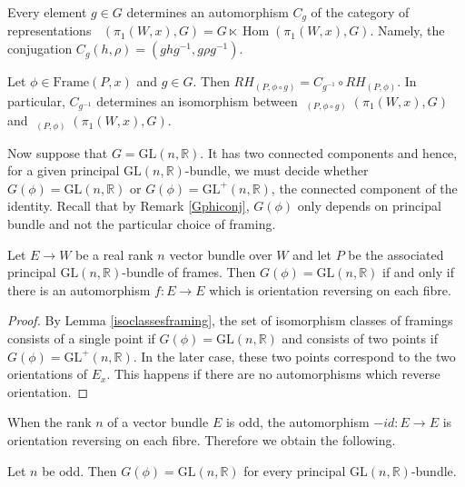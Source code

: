 \documentclass[10pt]{amsart}
\newcommand{\Hom}{\operatorname{Hom}}
\DeclareMathOperator{\Rep}{\underline{\operatorname{Rep}}}
\numberwithin{theoremalpha}{section}
\numberwithin{equation}{section}
\numberwithin{definition}{section}
\numberwithin{theorem}{section}
\numberwithin{proposition}{section}
\numberwithin{lemma}{section}
\numberwithin{example}{section}
\numberwithin{remark}{section}
\numberwithin{corollary}{section}
\numberwithin{question}{section}
\numberwithin{problem}{section}
\numberwithin{assumption}{section}
\theoremstyle{named}
\numberwithin{equation}{section}
\begin{document}
Every element $g \in G$ determines an automorphism $C_{g}$ of the category of representations $\Rep(\pi_{1}(W, x), G) = G \ltimes \Hom(\pi_{1}(W,x), G)$. Namely, the conjugation $C_{g}(h, \rho) = (ghg^{-1}, g \rho g^{-1})$. 

\begin{lemma}\label{lem:dependenceframing}
Let $\phi \in \mathrm{Frame}(P,x)$ and $g \in G$. Then $RH_{(P, \phi \circ g)} = C_{g^{-1}} \circ RH_{(P, \phi)}$. In particular, $C_{g^{-1}}$ determines an isomorphism between $\Rep_{(P,\phi \circ g)}(\pi_{1}(W, x), G)$ and $\Rep_{(P,\phi)}(\pi_{1}(W, x), G)$. 
\end{lemma}

Now suppose that $G = \mathrm{GL}(n, \mathbb{R})$. It has two connected components and hence, for a given principal $\mathrm{GL}(n, \mathbb{R})$-bundle, we must decide whether $G(\phi) = \mathrm{GL}(n, \mathbb{R})$ or $G(\phi) = \mathrm{GL}^+(n, \mathbb{R})$, the connected component of the identity. Recall that by Remark \ref{Gphiconj}, $G(\phi)$ only depends on principal bundle and not the particular choice of framing. 

\begin{lemma} \label{Gphidetermination}
Let $E \to W$ be a real rank $n$ vector bundle over $W$ and let $P$ be the associated principal $\mathrm{GL}(n, \mathbb{R})$-bundle of frames. Then $G(\phi) = \mathrm{GL}(n, \mathbb{R})$ if and only if there is an automorphism $f: E \to E$ which is orientation reversing on each fibre. 
\end{lemma}
\begin{proof}
By Lemma \ref{isoclassesframing}, the set of isomorphism classes of framings consists of a single point if $G(\phi) = \mathrm{GL}(n, \mathbb{R})$ and consists of two points if $G(\phi) = \mathrm{GL}^+(n, \mathbb{R})$. In the later case, these two points correspond to the two orientations of $E_{x}$. This happens if there are no automorphisms which reverse orientation. 
\end{proof}

When the rank $n$ of a vector bundle $E$ is odd, the automorphism $-id : E \to E$ is orientation reversing on each fibre. Therefore we obtain the following. 
\begin{corollary} \label{oddn}
Let $n$ be odd. Then $G(\phi) = \mathrm{GL}(n, \mathbb{R})$ for every principal $\mathrm{GL}(n, \mathbb{R})$-bundle. 
\end{corollary}
\end{document}

